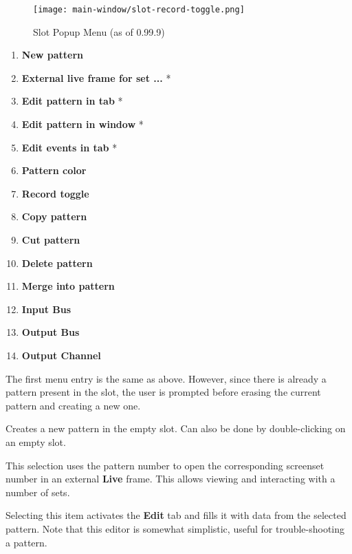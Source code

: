 \begin{figure}[H]
   \centering 
   \texttt{[image: main-window/slot-record-toggle.png]}
   \caption{Slot Popup Menu (as of 0.99.9)}
   \label{fig:slot_record_toggle}
\end{figure}

   \begin{enumerate}
      \item \textbf{New pattern}
      \item \textbf{External live frame for set ...} *
      \item \textbf{Edit pattern in tab} *
      \item \textbf{Edit pattern in window} *
      \item \textbf{Edit events in tab} *
      \item \textbf{Pattern color}
      \item \textbf{Record toggle}
      \item \textbf{Copy pattern}
      \item \textbf{Cut pattern}
      \item \textbf{Delete pattern}
      \item \textbf{Merge into pattern}
      \item \textbf{Input Bus}
      \item \textbf{Output Bus}
      \item \textbf{Output Channel}
   \end{enumerate}

   The first menu entry is the same as above.  However, since there is
   already a pattern present in the slot, the user is prompted before erasing
   the current pattern and creating a new one.

   \setcounter{ItemCounter}{0}      %

   Creates a new pattern in the empty slot.
   Can also be done by double-clicking on an empty slot.

   This selection uses the pattern number to open the corresponding screenset
   number in an external \textbf{Live} frame.
   This allows viewing and interacting with a number of sets.

   Selecting this item activates the \textbf{Edit} tab and fills it with data
   from the selected pattern.
   Note that this editor is somewhat simplistic, useful for trouble-shooting a
   pattern.

